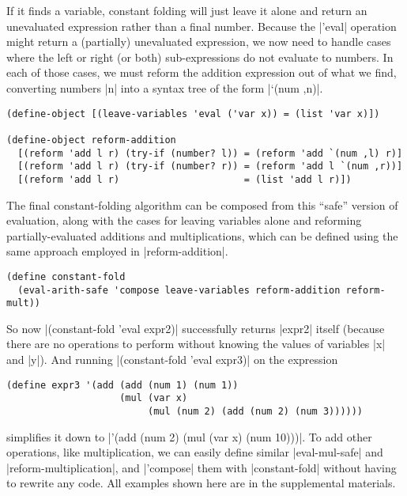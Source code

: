 If it finds a variable, constant folding will just leave it alone and return an unevaluated expression rather than a final number.
Because the \scm|'eval| operation might return a (partially) unevaluated expression, we now need to handle cases where the left or right (or both) sub-expressions do not evaluate to numbers.
In each of those cases, we must reform the addition expression out of what we find, converting numbers \scm|n| into a syntax tree of the form \scm|`(num ,n)|.
\begin{verbatim}
(define-object [(leave-variables 'eval ('var x)) = (list 'var x)])

(define-object reform-addition
  [(reform 'add l r) (try-if (number? l)) = (reform 'add `(num ,l) r)]
  [(reform 'add l r) (try-if (number? r)) = (reform 'add l `(num ,r))]
  [(reform 'add l r)                      = (list 'add l r)])
\end{verbatim}
The final constant-folding algorithm can be composed from this ``safe'' version of evaluation, along with the cases for leaving variables alone and reforming partially-evaluated additions and multiplications, which can be defined using the same approach employed in \scm|reform-addition|.
\begin{verbatim}
(define constant-fold
  (eval-arith-safe 'compose leave-variables reform-addition reform-mult))
\end{verbatim}
So now \scm|(constant-fold 'eval expr2)| successfully returns \scm|expr2| itself (because there are no operations to perform without knowing the values of variables \scm|x| and \scm|y|).
And running \scm|(constant-fold 'eval expr3)| on the expression
\begin{verbatim}
(define expr3 '(add (add (num 1) (num 1))
                    (mul (var x)
                         (mul (num 2) (add (num 2) (num 3))))))
\end{verbatim}
simplifies it down to \scm|'(add (num 2) (mul (var x) (num 10)))|.
To add other operations, like multiplication, we can easily define similar \scm|eval-mul-safe| and \scm|reform-multiplication|, and \scm|'compose| them with \scm|constant-fold| without having to rewrite any code.
All examples shown here are in the supplemental materials.


